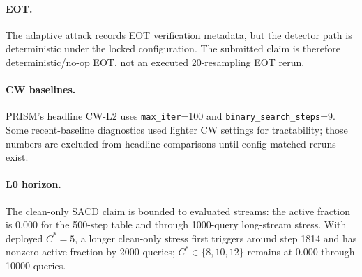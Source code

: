 \documentclass{article}
\newcommand{\prism}{\textsc{PRISM}\xspace}
\newcommand{\sacd}{\textsc{SACD}\xspace}
\begin{document}
\paragraph{EOT.}
The adaptive attack records EOT verification metadata, but the detector path is deterministic under the locked configuration. The submitted claim is therefore deterministic/no-op EOT, not an executed 20-resampling EOT rerun.

\paragraph{CW baselines.}
\prism's headline CW-L2 uses \texttt{max\_iter}=100 and \texttt{binary\_search\_steps}=9. Some recent-baseline diagnostics used lighter CW settings for tractability; those numbers are excluded from headline comparisons until config-matched reruns exist.

\paragraph{L0 horizon.}
The clean-only \sacd claim is bounded to evaluated streams: the active fraction is $0.000$ for the 500-step table and through 1000-query long-stream stress. With deployed $C^*=5$, a longer clean-only stress first triggers around step 1814 and has nonzero active fraction by 2000 queries; $C^*\in\{8,10,12\}$ remains at $0.000$ through 10000 queries.
\end{document}
